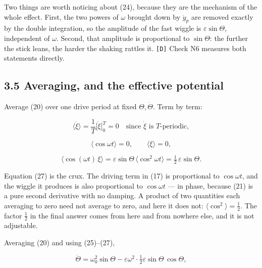 \documentclass[11pt,a4paper]{article}
\newcommand{\tagmark}[1]{\marginnote{\scriptsize\ttfamily #1}}
\newcommand{\Dtag}{\tagmark{[D]}}   %
\providecommand{\passthrough}[1]{#1}
\begin{document}
Two things are worth noticing about (24), because they are the mechanism of the
whole effect. First, the two powers of \(\omega\) brought down by \(\ddot y_p\) are
removed exactly by the double integration, so the amplitude of the fast wiggle
is \(\varepsilon\sin\Theta\), independent of \(\omega\). Second, that amplitude is
proportional to \(\sin\Theta\): the further the stick leans, the harder the shaking
rattles it. \passthrough{\lstinline![D]!} Check N6 measures both statements directly.

\hypertarget{averaging-and-the-effective-potential}{%
\subsection{3.5 Averaging, and the effective potential}\label{averaging-and-the-effective-potential}}

Average (20) over one drive period at fixed \(\Theta,\dot\Theta\). Term by term:

\begin{equation}
\langle\ddot\xi\rangle = \frac{1}{T}\bigl[\dot\xi\bigr]_0^T = 0
  \quad\text{since }\dot\xi\text{ is }T\text{-periodic}, \tag{25}
\end{equation}

\begin{equation}
\langle\cos\omega t\rangle = 0,\qquad \langle\xi\rangle = 0, \tag{26}
\end{equation}

\begin{equation}
\langle \cos(\omega t)\,\xi\rangle
 = \varepsilon\sin\Theta\,\langle\cos^2\omega t\rangle
 = \tfrac12\,\varepsilon\sin\Theta. \tag{27}
\end{equation}

\Dtag{} Equation (27) is the crux. The driving term in (17) is proportional to
\(\cos\omega t\), and the wiggle it produces is also proportional to
\(\cos\omega t\) --- in phase, because (21) is a pure second derivative with no
damping. A product of two quantities each averaging to zero need not average to
zero, and here it does not: \(\langle\cos^2\rangle=\tfrac12\). The factor
\(\tfrac12\) in the final answer comes from here and from nowhere else, and it is
not adjustable.

Averaging (20) and using (25)--(27),

\[
\ddot\Theta = \omega_0^2\sin\Theta
   - \varepsilon\omega^2\cdot\tfrac12\varepsilon\sin\Theta\,\cos\Theta,
\]
\end{document}

